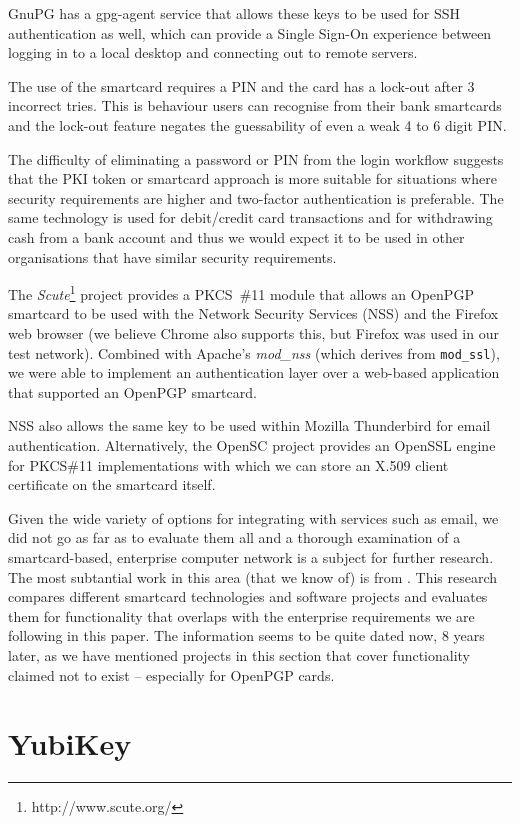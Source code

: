 \documentclass{report}
\begin{document}
GnuPG has a gpg-agent service that allows these keys to be used for SSH
authentication as well, which can provide a Single Sign-On experience
between logging in to a local desktop and connecting out to remote servers.

The use of the
smartcard requires a PIN and the card has a lock-out after 3 incorrect tries.
This is behaviour users can recognise from their bank smartcards and the
lock-out feature negates the guessability of even a weak 4 to 6 digit PIN.

The difficulty of eliminating a password or PIN from the login workflow
suggests that the PKI token or smartcard approach is more suitable for
situations where security requirements are higher and two-factor authentication
is preferable. The same technology is used for debit/credit card transactions
and for withdrawing cash from a bank account and thus we would expect it
to be used in other organisations that have similar security requirements.

The \emph{Scute}\footnote{http://www.scute.org/}
project provides a PKCS~\#11 module that allows an OpenPGP
smartcard to be used with the Network Security Services (NSS) and
the Firefox web browser (we believe Chrome also supports this, but Firefox
was used in our test network). Combined with Apache's \emph{mod\_nss} (which
derives from \texttt{mod\_ssl}), we were able to implement an authentication layer
over a web-based application that supported an OpenPGP smartcard.

NSS also allows the same key to be used within Mozilla Thunderbird for
email authentication. Alternatively, the OpenSC project provides an
OpenSSL engine for PKCS\#11 implementations with which we can store an X.509
client certificate on the smartcard itself.

Given the wide variety of
options for integrating with services such as email, we did not go as far
as to evaluate them all and a thorough examination of a smartcard-based,
enterprise computer network is a subject for further research. The most
subtantial work in this area (that we know of) is from \textcite{grossesecuring}.
This research compares different smartcard technologies and software projects
and evaluates them for functionality that overlaps with the enterprise
requirements we are following in this paper. The information seems to be
quite dated now, 8 years later, as we have mentioned projects in this
section that cover functionality claimed not to exist -- especially for OpenPGP
cards.

\section{YubiKey}
\end{document}
